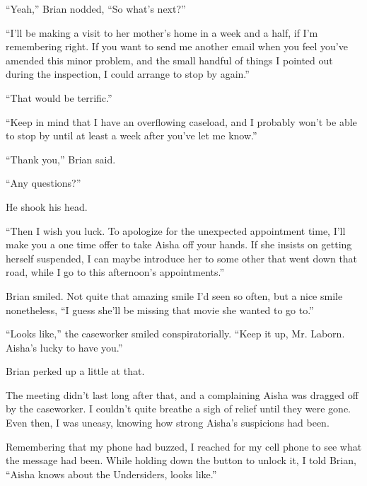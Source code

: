 ``Yeah,'' Brian nodded, ``So what's next?''



``I'll be making a visit to her mother's home in a week and a half, if I'm remembering right.  If you want to send me another email when you feel you've amended this minor problem, and the small handful of things I pointed out during the inspection, I could arrange to stop by again.''



``That would be terrific.''



``Keep in mind that I have an overflowing caseload, and I probably won't be able to stop by until at least a week after you've let me know.''



``Thank you,'' Brian said.



``Any questions?''



He shook his head.



``Then I wish you luck.  To apologize for the unexpected appointment time, I'll make you a one time offer to take Aisha off your hands.  If she insists on getting herself suspended, I can maybe introduce her to some other that went down that road, while I go to this afternoon's appointments.''



Brian smiled.  Not quite that amazing smile I'd seen so often, but a nice smile nonetheless, ``I guess she'll be missing that movie she wanted to go to.''



``Looks like,'' the caseworker smiled conspiratorially.  ``Keep it up, Mr. Laborn.  Aisha's lucky to have you.''



Brian perked up a little at that.



The meeting didn't last long after that, and a complaining Aisha was dragged off by the caseworker.  I couldn't quite breathe a sigh of relief until they were gone.  Even then, I was uneasy, knowing how strong Aisha's suspicions had been.



Remembering that my phone had buzzed, I reached for my cell phone to see what the message had been.  While holding down the button to unlock it, I told Brian, ``Aisha knows about the Undersiders, looks like.''



